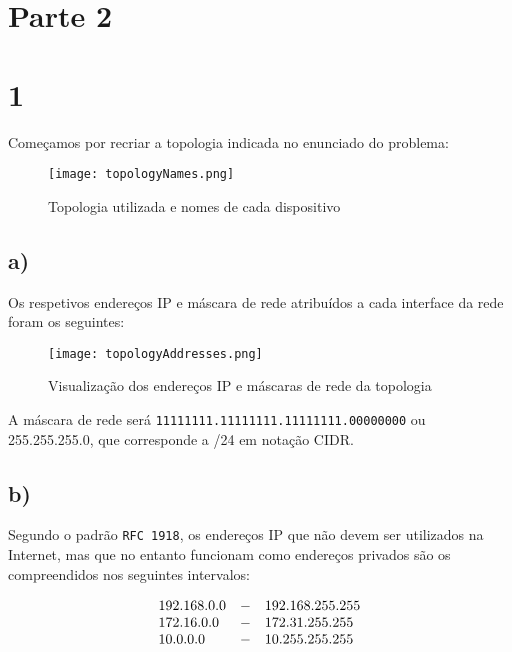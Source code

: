 \documentclass{llncs}
\begin{document}
\newpage
\vspace{-1.9em}

\section*{Parte 2}

\section*{1}

Começamos por recriar a topologia indicada no enunciado do problema:

\begin{figure}[!ht]
    \begin{center}
        \texttt{[image: topologyNames.png]}
        \caption{Topologia utilizada e nomes de cada dispositivo}
    \end{center}
\end{figure}

\vspace*{-2.5em}

\subsection*{a)}

Os respetivos endereços IP e máscara de rede atribuídos a cada interface da rede foram os seguintes:

\begin{figure}[!ht]
    \begin{center}
        \texttt{[image: topologyAddresses.png]}
        \caption{Visualização dos endereços IP e máscaras de rede da topologia}
    \end{center}
\end{figure}

A máscara de rede será \texttt{11111111.11111111.11111111.00000000} ou 255.255.255.0, que corresponde a /24 em notação CIDR. 

\subsection*{b)}

Segundo o padrão \texttt{RFC 1918}, os endereços IP que não devem ser utilizados na Internet, mas que no entanto funcionam como endereços privados são os compreendidos nos seguintes intervalos:

\[
\begin{array}{l l l}
    192.168.0.0&-&192.168.255.255 \\
    172.16.0.0&-&172.31.255.255 \\
    10.0.0.0&-&10.255.255.255
\end{array}
\]
\end{document}
